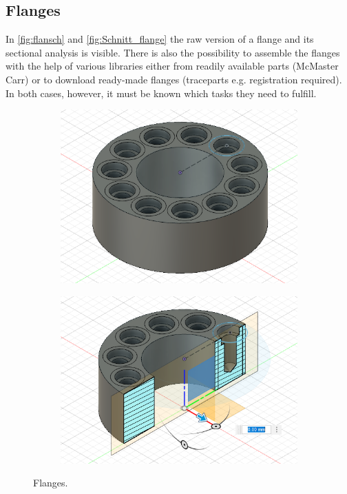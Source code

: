 \subsection{Flanges}

In \autoref{fig:flansch} and \autoref{fig:Schnitt_flange} the raw version of a flange and its sectional analysis is visible.
There is also the possibility to assemble the flanges with the help of various libraries either from readily available parts (McMaster Carr) or to download ready-made flanges (traceparts e.g. registration required).
In both cases, however, it must be known which tasks they need to fulfill.


\begin{figure}[H]
    \centering
    \begin{subfigure}[b]{0.49\textwidth}
        \centering
        \includegraphics[width=1\textwidth]{sections/imges/vacuum_vessel/Flange.PNG}
        \label{fig:flansch}
    \end{subfigure}
    \hfil
    \begin{subfigure}[b]{0.49\textwidth}
        \centering
        \includegraphics[width=1\textwidth]{sections/imges/vacuum_vessel/Flange_Schnitt.PNG}
        \label{fig:Schnitt_flange}
    \end{subfigure}
    \caption{Flanges.}
    \label{fig:flanges}
\end{figure}

